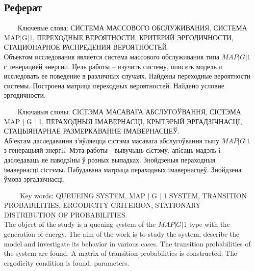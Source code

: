 \documentclass[12pt, a4paper]{article}
\begin{document}
\begin{center}
	\section*{Реферат}
	\begin{flushleft}
		$\qquad$Ключевые слова: СИСТЕМА МАССОВОГО ОБСЛУЖИВАНИЯ,
		СИСТЕМА MAP|G|1, ПЕРЕХОДНЫЕ ВЕРОЯТНОСТИ, КРИТЕРИЙ
		ЭРГОДИЧНОСТИ, СТАЦИОНАРНОЕ РАСПРЕДЕНИЯ ВЕРОЯТНОСТЕЙ.\\
		Объектом исследования является система массового обслуживания типа
		$MAP|G|1$ с генерацией энергии. Цель работы – изучить систему, описать модель
		и исследовать ее поведение в различных случаях. Найдены переходные
		вероятности системы. Построена матрица переходных вероятностей. Найдено
		условие эргодичности.
	\end{flushleft}
	\begin{flushleft}
		$\qquad$Ключавыя словы: СIСТЭМА МАСАВАГА АБСЛУГОЎВАННЯ,
		СIСТЭМА MAP | G | 1, ПЕРАХОДНЫЯ IМАВЕРНАСЦI, КРЫТЭРЫЙ
		ЭРГАДЗIЧНАСЦI, СТАЦЫЯНАРНАЕ РАЗМЕРКАВАННЕ IМАВЕРНАСЦЕЎ.\\
		Аб’ектам даследавання з’яўляецца сiстэма масавага абслугоўвання тыпу
		$MAP|G|1$ з генерацыяй энергii. Мэта работы - вывучыць сiстэму, апiсаць мадэль
		i даследаваць яе паводзiны ў розных выпадках. Знойдзеныя пераходныя
		iмавернасцi сiстэмы. Пабудавана матрыца пераходных iмавернасцеў.
		Знойдзена ўмова эргадзічнасці.
	\end{flushleft}
	\begin{flushleft}
		$\qquad$ Key words: QUEUEING SYSTEM, MAP | G | 1 SYSTEM, TRANSITION
		PROBABILITIES, ERGODICITY CRITERION, STATIONARY DISTRIBUTION
		OF PROBABILITIES.\\
		The object of the study is a queuing system of the $MAP|G|1$ type with the
		generation of energy. The aim of the work is to study the system, describe the
		model and investigate its behavior in various cases. The transition probabilities
		of the system are found. A matrix of transition probabilities is constructed. The
		ergodicity condition is found.
		parameters.

	\end{flushleft}
\end{center}
\newpage
\tableofcontents
\end{document}
